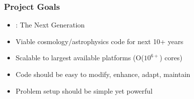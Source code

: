\begin{frame}[fragile] \frametitle{Project Goals}
   \begin{itemize}
      \item{} \enzo: The Next Generation
      \item{} Viable cosmology/astrophysics code for next 10+ years
      \item{} Scalable to largest available platforms (O($10^{6+}$)  cores)
      \item{} Code should be easy to modify, enhance, adapt, maintain
      \item{} Problem setup should be simple yet powerful
   \end{itemize}
\end{frame}
